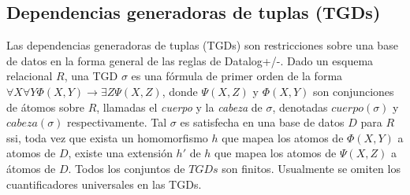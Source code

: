 \documentclass[11pt,a4paper,twoside]{tesis}
\newtheorem{exmp}{Ejemplo}
\begin{document}

\subsection{Dependencias generadoras de tuplas (TGDs)}
Las dependencias generadoras de tuplas (TGDs) son restricciones sobre una base de datos en la forma general de las reglas de Datalog+/-.
Dado un esquema relacional $R$, una TGD $\sigma$ es una fórmula de primer orden de la forma $\forall X \forall Y \Phi (X, Y) \rightarrow \exists Z \Psi (X, Z)$, donde $ \Psi (X, Z)$ y $\Phi (X, Y)$ son conjunciones de átomos sobre $R$, llamadas el \textit{cuerpo} y la \textit{cabeza} de $\sigma$, denotadas $cuerpo(\sigma)$ y $cabeza(\sigma)$ respectivamente. Tal $\sigma$ es satisfecha en una base de datos $D$ para $R$ ssi, toda vez que exista un homomorfismo $h$ que mapea los atomos de $\Phi(X, Y)$ a atomos de $D$, existe una extensión $h\prime$ de $h$ que mapea los atomos de $\Psi (X, Z)$ a átomos de $D$. Todos los conjuntos de $TGDs$ son finitos. Usualmente se omiten los cuantificadores universales en las TGDs.

\end{document}

